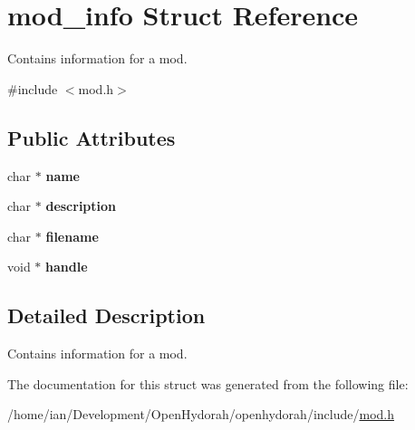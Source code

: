 \hypertarget{structmod__info}{\section{mod\-\_\-info Struct Reference}
\label{structmod__info}
}


Contains information for a mod.  




{\ttfamily \#include $<$mod.\-h$>$}

\subsection*{Public Attributes}
\begin{DoxyCompactItemize}
\item 
\hypertarget{structmod__info_ae15ed9fd7be9fe6e5f1f7eb82d349a11}{char $\ast$ {\bfseries name}}\label{structmod__info_ae15ed9fd7be9fe6e5f1f7eb82d349a11}

\item 
\hypertarget{structmod__info_a9c7bfccb1afcd4fc72fec2bbf676cd15}{char $\ast$ {\bfseries description}}\label{structmod__info_a9c7bfccb1afcd4fc72fec2bbf676cd15}

\item 
\hypertarget{structmod__info_ab04a25af5df2df232f5093d3da2058c8}{char $\ast$ {\bfseries filename}}\label{structmod__info_ab04a25af5df2df232f5093d3da2058c8}

\item 
\hypertarget{structmod__info_ad764331cf8600ca5f05271c283823f16}{void $\ast$ {\bfseries handle}}\label{structmod__info_ad764331cf8600ca5f05271c283823f16}

\end{DoxyCompactItemize}


\subsection{Detailed Description}
Contains information for a mod. 

The documentation for this struct was generated from the following file\-:\begin{DoxyCompactItemize}
\item 
/home/ian/\-Development/\-Open\-Hydorah/openhydorah/include/\hyperlink{mod_8h}{mod.\-h}\end{DoxyCompactItemize}
